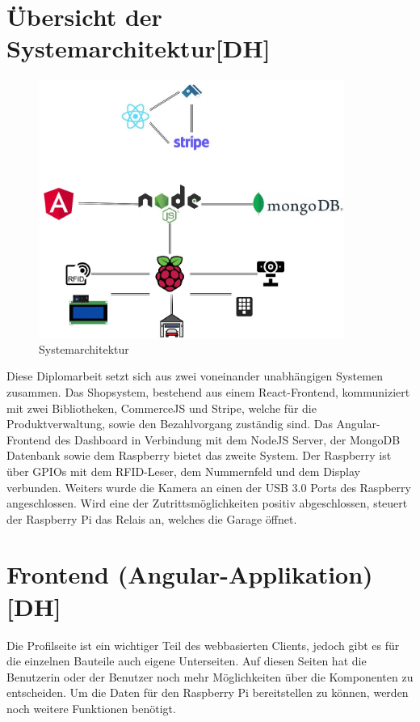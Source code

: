 \section{Übersicht der Systemarchitektur[DH]}
\begin{figure}[h]
    \centering
    \includegraphics[width=10cm]{pics/APERTASystemarchitektur.jpg}
    \caption{Systemarchitektur}
    \end{figure}
Diese Diplomarbeit setzt sich aus zwei voneinander unabhängigen Systemen zusammen. Das Shopsystem, bestehend aus einem React-Frontend, kommuniziert mit zwei Bibliotheken, CommerceJS und Stripe, welche für die Produktverwaltung, sowie den Bezahlvorgang zuständig sind. Das Angular-Frontend des Dashboard in Verbindung mit dem NodeJS Server, der MongoDB Datenbank sowie dem Raspberry bietet das zweite System.
Der Raspberry ist über GPIOs mit dem RFID-Leser, dem Nummernfeld und dem Display verbunden. Weiters wurde die Kamera an einen der USB 3.0 Ports des Raspberry angeschlossen. Wird eine der Zutrittsmöglichkeiten positiv abgeschlossen, steuert der Raspberry Pi das Relais an, welches die Garage öffnet.
\newpage
\section{Frontend (Angular-Applikation) [DH]}

Die Profilseite ist ein wichtiger Teil des webbasierten Clients, jedoch gibt es für die einzelnen Bauteile auch eigene Unterseiten. Auf diesen Seiten hat die Benutzerin oder der Benutzer noch mehr Möglichkeiten über die Komponenten zu entscheiden. Um die Daten für den Raspberry Pi bereitstellen zu können, werden noch weitere Funktionen benötigt.

